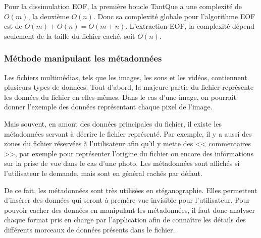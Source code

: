 \documentclass[11pt]{article}
\begin{document}
Pour la dissimulation EOF, la première boucle TantQue a une complexité de $O(m)$, 
la deuxième $O(n)$. \newline Donc sa complexité globale pour l'algorithme 
EOF est de $O(m)+O(n)=O(m+n)$. \newline
L'extraction EOF, la complexité dépend seulement de la taille du fichier 
caché, soit $O(n)$.

\subsubsection{Méthode manipulant les métadonnées}

Les fichiers multimédias, tels que les images, les sons et les vidéos,
contiennent plusieurs types de données. Tout d'abord, la majeure partie du
fichier représente les données du fichier en elles-mêmes. Dans le cas d'une
image, on pourrait donner l'exemple des données représentant chaque pixel de
l'image. 

Mais souvent, en amont des données principales du fichier, il existe les
métadonnées servant à décrire le fichier représenté. Par exemple, il y a 
aussi des zones du fichier réservées à l'utilisateur afin qu'il y mette des 
<< commentaires >>, par exemple pour représenter l'origine du fichier ou 
encore des informations sur la prise de vue dans le cas d'une photo. 
Les métadonnées sont affichés si l'utilisateur le demande, mais sont en 
général cachés par défaut.

De ce fait, les métadonnées sont très utilisées en stéganographie. Elles
permettent d'insérer des données qui seront à premère vue invisible pour
l'utilisateur. Pour pouvoir cacher des données en manipulant les métadonnées,
il faut donc analyser chaque format pris en charge par l'application afin de
connaître les détails des différents morceaux de données présents dans le
fichier. 
\end{document}

